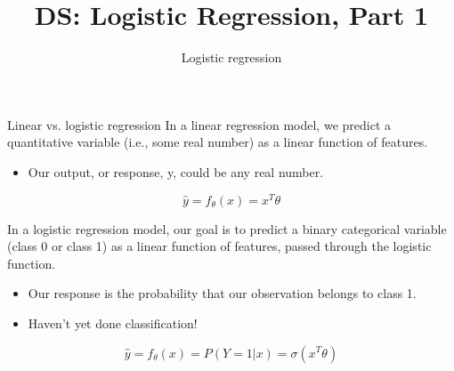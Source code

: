 \documentclass[aspectratio=169]{../latex_main/tntbeamer}  %
\title[Introduction]{DS: Logistic Regression, Part 1}
\subtitle{Logistic regression}
\begin{document}
	
	\maketitle
	\begin{frame}{Linear vs. logistic regression}
	    In a linear regression model, we predict a quantitative variable (i.e., some real number) as a linear function of features.
	    \begin{itemize}
	        \item Our output, or response, y, could be any real number.
	    \end{itemize}
	    \begin{equation*}
	        \hat{y} = f_\theta (x) = x^T\theta
	    \end{equation*}
	    
	    In a logistic regression model, our goal is to predict a binary categorical variable (class 0 or class 1) as a linear function of features, passed through the logistic function.
	    \begin{itemize}
	        \item Our response is the probability that our observation belongs to class 1.
	        \item Haven’t yet done classification!
	    \end{itemize}
	    \begin{equation*}
	        \hat{y} =f_\theta (x) = P(Y=1|x) = \sigma (x^T\theta)
	    \end{equation*}
	\end{frame}
	
\end{document}
